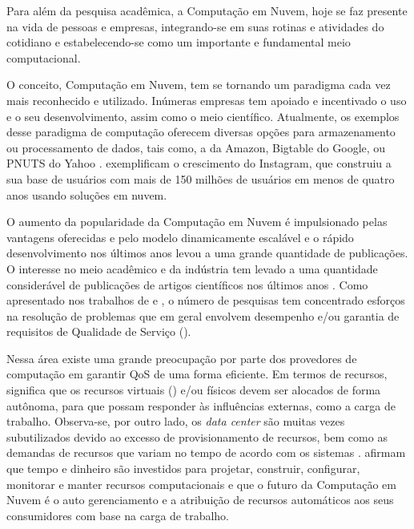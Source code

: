 \setcounter{page}{1}
Para além da pesquisa acadêmica, a Computação em Nuvem, hoje se faz presente na vida de pessoas e empresas, integrando-se em suas rotinas e atividades do cotidiano e estabelecendo-se como um importante e fundamental meio computacional. 

O conceito, Computação em Nuvem, tem se tornando um paradigma cada vez mais reconhecido e utilizado. Inúmeras empresas tem apoiado e incentivado o uso e o seu desenvolvimento, assim como o meio científico. Atualmente, os exemplos desse paradigma de computação oferecem diversas opções para armazenamento ou processamento de dados, tais como, a \textit{} da Amazon, Bigtable do Google, ou PNUTS do Yahoo \cite{Binnig2009}.  exemplificam o crescimento do Instagram, que construiu a sua base de usuários com mais de 150 milhões de usuários em menos de quatro anos usando soluções em nuvem.

O aumento da popularidade da Computação em Nuvem é impulsionado pelas vantagens oferecidas e pelo modelo dinamicamente escalável e o rápido desenvolvimento nos últimos anos levou a uma grande quantidade de publicações. O interesse no meio acadêmico e da indústria tem levado a uma quantidade considerável de publicações de artigos científicos nos últimos anos \cite{Heilig2014}. Como apresentado nos trabalhos de  e , o número de pesquisas tem concentrado esforços na resolução de problemas que em geral envolvem desempenho e/ou garantia de requisitos de Qualidade de Serviço (\textit{}). 

Nessa área existe uma grande preocupação por parte dos provedores de computação em garantir QoS de uma forma eficiente. Em termos de recursos, significa que os recursos virtuais (\textit{}) e/ou físicos devem ser alocados de forma autônoma, para que possam responder às influências externas, como a carga de trabalho. Observa-se, por outro lado, os \textit{data center} são muitas vezes subutilizados devido ao excesso de provisionamento de recursos, bem como as demandas de recursos que variam no tempo de acordo com os sistemas \cite{Padala2007}.  afirmam que tempo e dinheiro são investidos para projetar, construir, configurar, monitorar e manter recursos computacionais e que o futuro da Computação em Nuvem é o auto gerenciamento e a atribuição de recursos automáticos aos seus consumidores com base na carga de trabalho.

